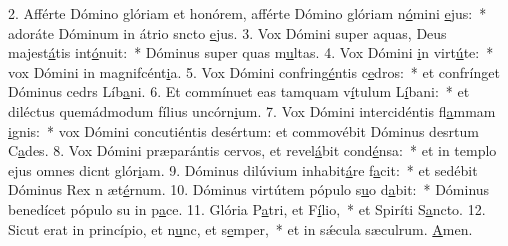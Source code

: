 2. Afférte Dómino glóriam et honórem, afférte Dómino glóriam n\uline{ó}mini \uline{e}jus:~* adoráte Dóminum in átrio sncto \uline{e}jus.
3. Vox Dómini super aquas, Deus majest\uline{á}tis int\uline{ó}nuit:~* Dóminus super quas m\uline{u}ltas.
4. Vox Dómini \uline{i}n virt\uline{ú}te:~* vox Dómini in magnifcént\uline{i}a.
5. Vox Dómini confring\uline{é}ntis c\uline{e}dros:~* et confrínget Dóminus cedrs Líb\uline{a}ni.
6. Et commínuet eas tamquam v\uline{í}tulum L\uline{í}bani:~* et diléctus quemádmodum fílius uncórn\uline{i}um.
7. Vox Dómini intercidéntis fl\uline{a}mmam \uline{i}gnis:~* vox Dómini concutiéntis desértum: et commovébit Dóminus desrtum C\uline{a}des.
8. Vox Dómini præparántis cervos, et revel\uline{á}bit cond\uline{é}nsa:~* et in templo ejus omnes dicnt glór\uline{i}am.
9. Dóminus dilúvium inhabit\uline{á}re f\uline{a}cit:~* et sedébit Dóminus Rex n æt\uline{é}rnum.
10. Dóminus virtútem pópulo s\uline{u}o d\uline{a}bit:~* Dóminus benedícet pópulo su in p\uline{a}ce.
11. Glória P\uline{a}tri, et F\uline{í}lio,~* et Spiríti S\uline{a}ncto.
12. Sicut erat in princípio, et n\uline{u}nc, et s\uline{e}mper,~* et in sǽcula sæculrum. \uline{A}men.
